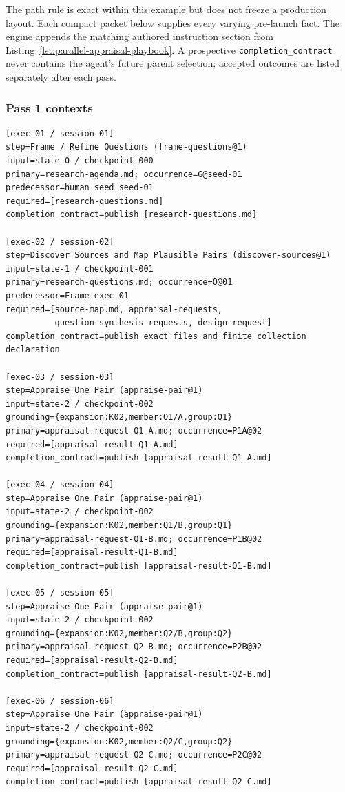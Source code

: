 \documentclass[11pt]{article}
\begin{document}
The path rule is exact within this example but does not freeze a production
layout. Each compact packet below supplies every varying pre-launch fact. The
engine appends the matching authored instruction section from
Listing~\ref{lst:parallel-appraisal-playbook}. A prospective
\texttt{completion\_contract} never contains the agent's future parent
selection; accepted outcomes are listed separately after each pass.

\subsubsection{Pass 1 contexts}

\begin{lstlisting}[style=playbook,basicstyle=\ttfamily\tiny]
[exec-01 / session-01]
step=Frame / Refine Questions (frame-questions@1)
input=state-0 / checkpoint-000
primary=research-agenda.md; occurrence=G@seed-01
predecessor=human seed seed-01
required=[research-questions.md]
completion_contract=publish [research-questions.md]

[exec-02 / session-02]
step=Discover Sources and Map Plausible Pairs (discover-sources@1)
input=state-1 / checkpoint-001
primary=research-questions.md; occurrence=Q@01
predecessor=Frame exec-01
required=[source-map.md, appraisal-requests,
          question-synthesis-requests, design-request]
completion_contract=publish exact files and finite collection declaration

[exec-03 / session-03]
step=Appraise One Pair (appraise-pair@1)
input=state-2 / checkpoint-002
grounding={expansion:K02,member:Q1/A,group:Q1}
primary=appraisal-request-Q1-A.md; occurrence=P1A@02
required=[appraisal-result-Q1-A.md]
completion_contract=publish [appraisal-result-Q1-A.md]

[exec-04 / session-04]
step=Appraise One Pair (appraise-pair@1)
input=state-2 / checkpoint-002
grounding={expansion:K02,member:Q1/B,group:Q1}
primary=appraisal-request-Q1-B.md; occurrence=P1B@02
required=[appraisal-result-Q1-B.md]
completion_contract=publish [appraisal-result-Q1-B.md]

[exec-05 / session-05]
step=Appraise One Pair (appraise-pair@1)
input=state-2 / checkpoint-002
grounding={expansion:K02,member:Q2/B,group:Q2}
primary=appraisal-request-Q2-B.md; occurrence=P2B@02
required=[appraisal-result-Q2-B.md]
completion_contract=publish [appraisal-result-Q2-B.md]

[exec-06 / session-06]
step=Appraise One Pair (appraise-pair@1)
input=state-2 / checkpoint-002
grounding={expansion:K02,member:Q2/C,group:Q2}
primary=appraisal-request-Q2-C.md; occurrence=P2C@02
required=[appraisal-result-Q2-C.md]
completion_contract=publish [appraisal-result-Q2-C.md]


\end{lstlisting}
\end{document}
